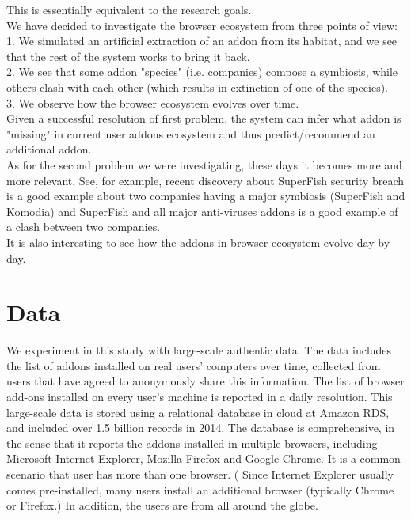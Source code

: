 \documentclass[11pt,oneside]{book}
\let\Oldsection\section
\renewcommand{\section}{\FloatBarrier\Oldsection}
\begin{document}
This is essentially equivalent to the research goals.\\
We have decided to investigate the browser ecosystem from three points of view:\\
1. We simulated an artificial extraction of an addon from its habitat, and we see that the rest of the system works to bring it back.\\
2. We see that some addon "species" (i.e. companies) compose a symbiosis, while others clash with each other (which results in extinction of one of the species).\\
3. We observe how the browser ecosystem evolves over time.\\
Given a successful resolution of first problem, the system can infer what addon is "missing" in current user addons ecosystem and thus predict/recommend an additional addon.\\
As for the second problem we were investigating, these days it becomes more and more relevant. See, for example, recent discovery about SuperFish security breach is a good example about two companies having a major symbiosis (SuperFish and Komodia) and SuperFish and all major anti-viruses addons is a good example of a clash between two companies.\\
It is also interesting to see how the addons in browser ecosystem evolve day by day.



\chapter{Data}
\label{sec:datasets}

We experiment in this study with large-scale authentic data.  The data includes the list of addons installed on real users' computers over time, collected from users that have agreed to anonymously share this information.  The list of browser add-ons installed on every user's machine is reported in a daily resolution.  This large-scale data is stored using a relational database in cloud at Amazon RDS, and included over 1.5 billion records in 2014. The database is comprehensive, in the sense that it  reports the addons installed in multiple browsers, including Microsoft Internet  Explorer, Mozilla Firefox and Google Chrome. It  is a common scenario that user has more than one browser. ( Since Internet Explorer usually comes pre-installed, many users install an additional browser (typically Chrome or Firefox.) In addition, the users are from all around the globe. 
\end{document}
